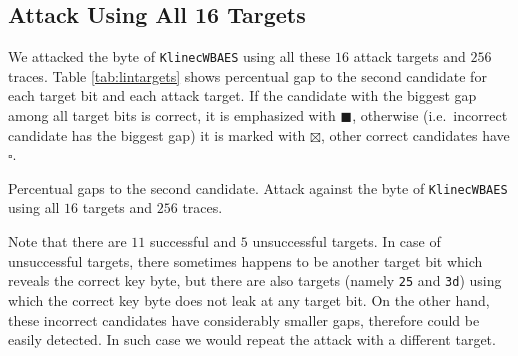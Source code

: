 \subsection{Attack Using All 16 Targets}

We attacked the  byte of {\tt KlinecWBAES} using all these $16$ attack targets and $256$ traces. Table \ref{tab:lintargets} shows percentual gap to the second candidate for each target bit and each attack target. If the candidate with the biggest gap among all target bits is correct, it is emphasized with $\blacksquare$, otherwise (i.e.\ incorrect candidate has the biggest gap) it is marked with $\boxtimes$, other correct candidates have $\square$.

\begin{table}[h]
	\begin{center}
	
	\end{center}
\caption{Percentual gaps to the second candidate. Attack against the  byte of {\tt KlinecWBAES} using all $16$ targets and $256$ traces.}
\label{tab:lintargets}
\end{table}

Note that there are $11$ successful and $5$ unsuccessful targets. In case of unsuccessful targets, there sometimes happens to be another target bit which reveals the correct key byte, but there are also targets (namely {\tt 25} and {\tt 3d}) using which the correct key byte does not leak at any target bit. On the other hand, these incorrect candidates have considerably smaller gaps, therefore could be easily detected. In such case we would repeat the attack with a different target.

